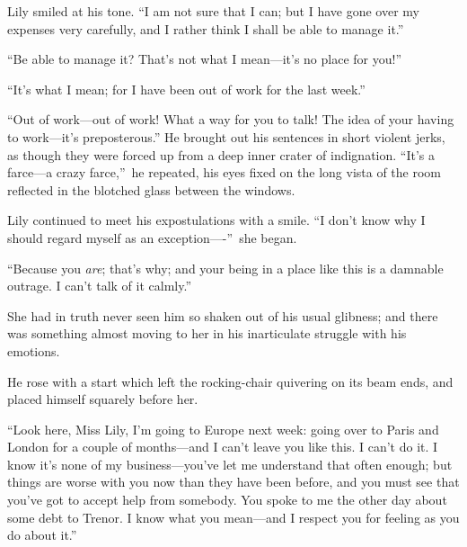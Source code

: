 \documentclass[12pt,a4paper]{book}
\begin{document}
Lily smiled at his tone. ``I am not sure that I can; but I have
gone over my expenses very carefully, and I rather think I shall
be able to manage it.''





``Be able to manage it? That's not what I mean---it's no place for
you!''





``It's what I mean; for I have been out of work for the last
week.''





``Out of work---out of work! What a way for you to talk! The idea
of your having to work---it's preposterous.'' He brought out his
sentences in short violent jerks, as though they were forced up
from a deep inner crater of indignation. ``It's a farce---a crazy
farce,''\ he repeated, his eyes fixed on the long vista of the room
reflected in the blotched glass between the windows.





Lily continued to meet his expostulations with a smile. ``I don't
know why I should regard myself as an exception----''\ she began.





``Because you \textit{are}; that's why; and your being in a place like this
is a damnable outrage. I can't talk of it calmly.''





She had in truth never seen him so shaken out of his usual
glibness; and there was something almost moving to her in his
inarticulate struggle with his emotions.





He rose with a start which left the rocking-chair quivering on
its beam ends, and placed himself squarely before her.





``Look here, Miss Lily, I'm going to Europe next week: going over
to Paris and London for a couple of months---and I can't leave you
like this. I can't do it. I know it's none of my business---you've
let me understand that often enough; but things are worse with
you now than they have been before, and you must see that you've
got to accept help from somebody. You spoke to me the other day
about some debt to Trenor. I know what you mean---and I respect
you for feeling as you do about it.''
\end{document}
